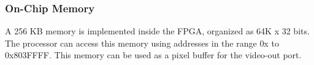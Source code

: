 \subsubsection{On-Chip Memory}
A 256 KB memory is implemented inside the FPGA, organized as 64K {\sf x} 32 bits. The 
{\processor} processor can access this memory using addresses in the range 
{\sf 0x} to {\sf 0x\baseAddressOffset 803FFFF}. This
memory can be used as a pixel buffer for the video-out port.

